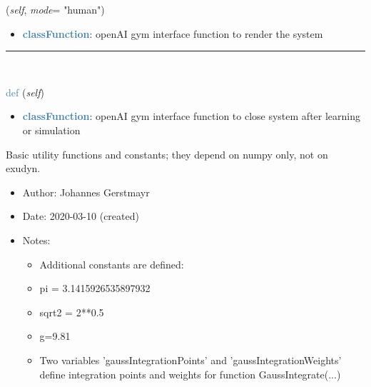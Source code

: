 \begin{itemize}[leftmargin=1.4cm]
\begin{itemize}[leftmargin=1.4cm]
\begin{flushleft}
({\it self}, {\it mode}= "human")
\end{flushleft}
\setlength{\itemindent}{0.7cm}
\begin{itemize}[leftmargin=0.7cm]
\item[--]\textcolor{steelblue}{\bf classFunction}: openAI gym interface function to render the system
\vspace{12pt}\end{itemize}
%
\noindent\rule{8cm}{0.75pt}\vspace{1pt} \\ 
\begin{flushleft}
\noindent \textcolor{steelblue}{def {\bf {}}}\label{sec:artificialIntelligence:OpenAIGymInterfaceEnv(Env):close}
({\it self})
\end{flushleft}
\setlength{\itemindent}{0.7cm}
\begin{itemize}[leftmargin=0.7cm]
\item[--]\textcolor{steelblue}{\bf classFunction}: openAI gym interface function to close system after learning or simulation
\vspace{12pt}\end{itemize}
%
\label{sec:module:basicUtilities}
  Basic utility functions and constants; they depend on numpy only, not on exudyn.
\begin{itemize}[leftmargin=1.4cm]
\setlength{\itemindent}{-1.4cm}
\item[]Author:    Johannes Gerstmayr
\item[]Date:      2020-03-10 (created)
\item[]Notes:
\vspace{-22pt}\begin{itemize}[leftmargin=0.5cm]
\setlength{\itemindent}{-0.5cm}
\item[]    Additional constants are defined: 
\item[]            pi = 3.1415926535897932 
\item[]            sqrt2 = 2**0.5
\item[]            g=9.81
\item[]            Two variables 'gaussIntegrationPoints' and 'gaussIntegrationWeights' define integration points and weights for function GaussIntegrate(...) 
\ei
\ei
\begin{flushleft}
\label{sec:basicUtilities:ClearWorkspace}

\end{flushleft}
\end{itemize}
\end{itemize}
\end{itemize}
\end{itemize}
